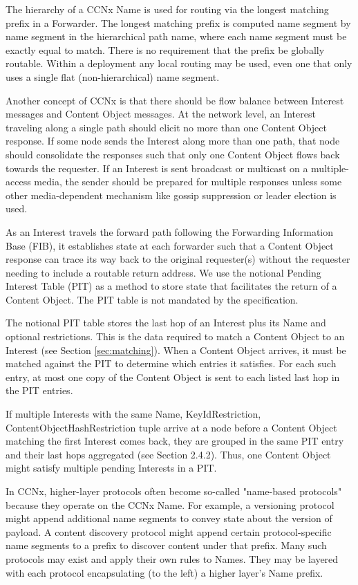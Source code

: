 \documentclass[12pt]{article}
\begin{document}
The hierarchy of a CCNx Name is used for routing via the longest
matching prefix in a Forwarder. The longest matching prefix is
computed name segment by name segment in the hierarchical path name,
where each name segment must be exactly equal to match.  There is no
requirement that the prefix be globally routable.  Within a
deployment any local routing may be used, even one that only uses a
single flat (non-hierarchical) name segment.

Another concept of CCNx is that there should be flow balance between
Interest messages and Content Object messages. At the network level,
an Interest traveling along a single path should elicit no more than
one Content Object response. If some node sends the Interest along
more than one path, that node should consolidate the responses such
that only one Content Object flows back towards the requester.  If an
Interest is sent broadcast or multicast on a multiple-access media,
the sender should be prepared for multiple responses unless some
other media-dependent mechanism like gossip suppression or leader
election is used.

As an Interest travels the forward path following the Forwarding
Information Base (FIB), it establishes state at each forwarder such
that a Content Object response can trace its way back to the original
requester(s) without the requester needing to include a routable
return address.  We use the notional Pending Interest Table (PIT) as
a method to store state that facilitates the return of a Content
Object. The PIT table is not mandated by the specification.

The notional PIT table stores the last hop of an Interest plus its
Name and optional restrictions.  This is the data required to match a
Content Object to an Interest (see Section \ref{sec:matching}).  When a Content Object
arrives, it must be matched against the PIT to determine which
entries it satisfies.  For each such entry, at most one copy of the
Content Object is sent to each listed last hop in the PIT entries.

If multiple Interests with the same {Name, KeyIdRestriction,
ContentObjectHashRestriction} tuple arrive at a node before a Content
Object matching the first Interest comes back, they are grouped in
the same PIT entry and their last hops aggregated (see
Section 2.4.2).  Thus, one Content Object might satisfy multiple
pending Interests in a PIT.

In CCNx, higher-layer protocols often become so-called "name-based
protocols" because they operate on the CCNx Name.  For example, a
versioning protocol might append additional name segments to convey
state about the version of payload.  A content discovery protocol
might append certain protocol-specific name segments to a prefix to
discover content under that prefix.  Many such protocols may exist
and apply their own rules to Names.  They may be layered with each
protocol encapsulating (to the left) a higher layer's Name prefix.
\end{document}
